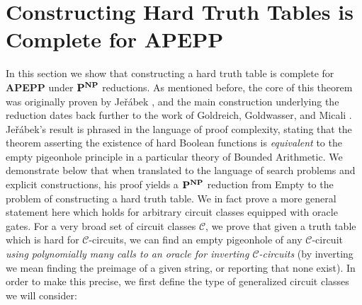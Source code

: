 \documentclass[11pt]{article}
\def\cl{\bf}
\begin{document}


\section{Constructing Hard Truth Tables is Complete for {\cl APEPP}}\label{sec:completeness}

In this section we show that constructing a hard truth table is complete for {\cl APEPP} under ${\cl P}^{\cl NP}$ reductions. As mentioned before, the core of this theorem was originally proven by Je\v{r}\'{a}bek \cite{Jerabek}, and the main construction underlying the reduction dates back further to the work of Goldreich, Goldwasser, and Micali \cite{GGM}.  Je\v{r}\'{a}bek's result is phrased in the language of proof complexity, stating that the theorem asserting the existence of hard Boolean functions is \emph{equivalent} to the empty pigeonhole principle in a particular theory of Bounded Arithmetic. We demonstrate below that when translated to the language of search problems and explicit constructions, his proof yields a ${\cl P}^{\cl NP}$ reduction from {\sc Empty} to the problem of constructing a hard truth table. We in fact prove a more general statement here which holds for arbitrary circuit classes equipped with oracle gates. For a very broad set of circuit classes $\mathcal{C}$, we prove that given a truth table which is hard for $\mathcal{C}$-circuits, we can find an empty pigeonhole of any $\mathcal{C}$-circuit \emph{using polynomially many calls to an oracle for inverting $\mathcal{C}$-circuits} (by inverting we mean finding the preimage of a given string, or reporting that none exist). In order to make this precise, we first define the type of generalized circuit classes we will consider:
\end{document}
